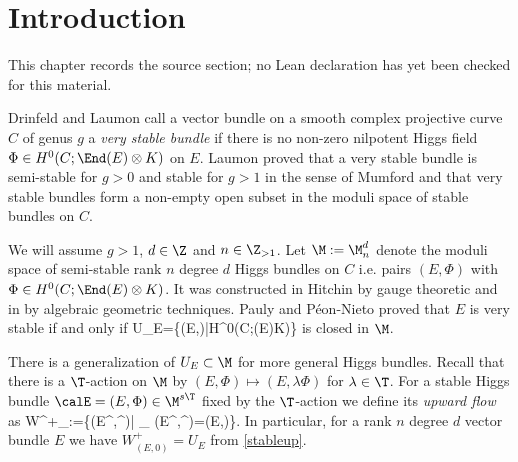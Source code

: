 \chapter{Introduction}
\label{very-stable-higgs-bundles-equivariant-multiplicity-mirror-symmetry-chapter-01}

\begin{remark}
\label{very-stable-higgs-bundles-equivariant-multiplicity-mirror-symmetry-chapter-01-source}
This chapter records the source section; no Lean declaration has yet been checked for this material.
\notready
\end{remark}

Drinfeld \cite{drinfeld}  and Laumon \cite{laumon} call a vector bundle on a smooth complex projective curve $C$ of genus $g$ a {\em very stable bundle} if there is no non-zero nilpotent Higgs field $\Phi\in H^0(C;\End(E)\otimes K)$ on $E$. Laumon \cite[Proposition 3.5]{laumon} proved that a very stable bundle
is semi-stable for $g>0$ and stable for $g>1$ in the sense of Mumford and that very stable bundles form a non-empty open subset in the moduli space of stable bundles on $C$. %

We will assume $g>1$, $d\in \Z$ and $n\in \Z_{>1}$. Let $\M:=\M^d_n$ denote the moduli space of semi-stable rank $n$ degree $d$ Higgs bundles on $C$ i.e. pairs $(E,\Phi)$ with $\Phi\in H^0(C;\End(E)\otimes K)$. It was constructed in Hitchin \cite{hitchin1} by gauge theoretic and in \cite{nitsure,simpson} by algebraic geometric techniques. Pauly and P\'eon-Nieto \cite{pauly-peon-nieto} proved that $E$ is very stable if and only if \beq \label{stableup}U_{E}=\{(E,\Phi)|\Phi\in H^0(C;\End(E)\otimes K)\} \subset \M\eeq is closed in $\M$.

There is a generalization of $U_{E}\subset \M$ for more general Higgs bundles. Recall that there is a $\T$-action on $\M$ by $(E,\Phi)\mapsto (E,\lambda\Phi)$ for $\lambda\in \T$. For a stable Higgs bundle
$\calE=(E,\Phi)\in \M^{s\T}$ fixed by the $\T$-action we define its {\em upward flow} as \beq\label{upwardflow}W^+_\calE:=\{(E^\prime,\Phi^\prime)\in \M | \lim_{\lambda {}} (E^\prime,\lambda\Phi^\prime)=(E,\Phi)\}.\eeq
{}
In particular, for a rank $n$ degree $d$ vector bundle $E$ we have $W^+_{(E,0)}=U_E$ from \eqref{stableup}.

